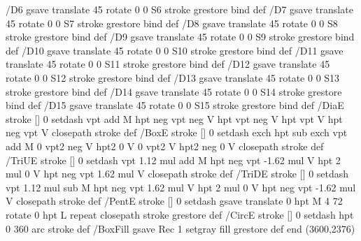 {/D6 { gsave translate 45 rotate 0 0 S6 stroke grestore } bind def
/D7 { gsave translate 45 rotate 0 0 S7 stroke grestore } bind def
/D8 { gsave translate 45 rotate 0 0 S8 stroke grestore } bind def
/D9 { gsave translate 45 rotate 0 0 S9 stroke grestore } bind def
/D10 { gsave translate 45 rotate 0 0 S10 stroke grestore } bind def
/D11 { gsave translate 45 rotate 0 0 S11 stroke grestore } bind def
/D12 { gsave translate 45 rotate 0 0 S12 stroke grestore } bind def
/D13 { gsave translate 45 rotate 0 0 S13 stroke grestore } bind def
/D14 { gsave translate 45 rotate 0 0 S14 stroke grestore } bind def
/D15 { gsave translate 45 rotate 0 0 S15 stroke grestore } bind def
/DiaE { stroke [] 0 setdash vpt add M
  hpt neg vpt neg V hpt vpt neg V
  hpt vpt V hpt neg vpt V closepath stroke } def
/BoxE { stroke [] 0 setdash exch hpt sub exch vpt add M
  0 vpt2 neg V hpt2 0 V 0 vpt2 V
  hpt2 neg 0 V closepath stroke } def
/TriUE { stroke [] 0 setdash vpt 1.12 mul add M
  hpt neg vpt -1.62 mul V
  hpt 2 mul 0 V
  hpt neg vpt 1.62 mul V closepath stroke } def
/TriDE { stroke [] 0 setdash vpt 1.12 mul sub M
  hpt neg vpt 1.62 mul V
  hpt 2 mul 0 V
  hpt neg vpt -1.62 mul V closepath stroke } def
/PentE { stroke [] 0 setdash gsave
  translate 0 hpt M 4 {72 rotate 0 hpt L} repeat
  closepath stroke grestore } def
/CircE { stroke [] 0 setdash 
  hpt 0 360 arc stroke } def
/BoxFill { gsave Rec 1 setgray fill grestore } def
end
}
\GNUPLOTpicture(3600,2376)
